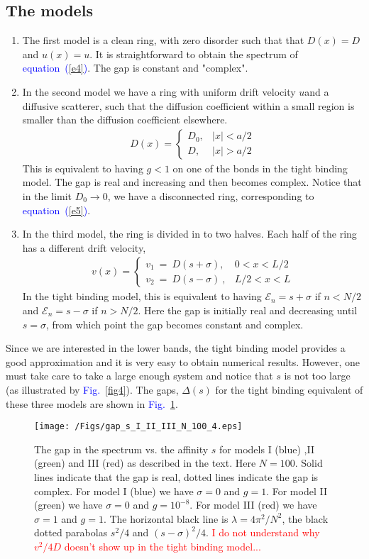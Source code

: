 \documentclass[aps,pre,floats,floatfix,fleqn,notitlepage]{revtex4-1}
\newcommand{\beq}{\begin{eqnarray}}
\newcommand{\eeq}{\end{eqnarray}}
\newcommand{\Eq}[1]{\textcolor{blue}{equation~(\ref{#1})}} %
\newcommand{\Fig}[1] {\textcolor{blue}{Fig.~\ref{#1}}} %
\newcommand{\rmrk}[1]{\textcolor{red}{#1}}
\begin{document}
\subsection{The models}
\begin{enumerate}
\item
The first model is a clean ring,  with zero disorder such that that  $D(x)=D$ and $u(x)=u$. 
It is straightforward to obtain the spectrum of \Eq{e4}.
%
The gap is constant and "complex". 
%
\item
In the second model we have a ring with uniform drift velocity $u$and a diffusive scatterer,
such that the diffusion coefficient within a small region is smaller than the diffusion coefficient elsewhere. 
%
\beq
D(x) = \left\{ \begin{array}{cc}
D_0, & |x|<a/2 \\
D, & |x|>a/2 
\end{array}
\right.
\eeq
%
This is equivalent to having $g<1$ on one of the bonds in the tight binding model.
The gap is real and increasing and then becomes complex. 
Notice that in the limit $D_0\to 0$, we have a disconnected ring, corresponding to \Eq{e5}.
%
\item
In the third model, the ring is divided in to two halves. Each half of the ring has a different drift velocity,
%
\beq
v(x) = \left\{ \begin{array}{cc}
v_1 \ =\  D(s+\sigma), & 0< x<L/2 \\
v_2 \ = \ D(s-\sigma)\ , & L/2<x<L
\end{array}
\right.
\eeq
%
In the tight binding model, this is equivalent to having $\mathcal{E}_n = s+\sigma$ if $n<N/2$ 
and $\mathcal{E}_n = s-\sigma$ if $n>N/2$. 
Here the gap is initially real and decreasing until $s=\sigma$, from which point the gap becomes constant and complex.
\end{enumerate}
%
Since we are interested in the lower bands, the tight binding model provides a good approximation 
and it is very easy to obtain numerical results.
However, one must take care to take a large enough system and notice that $s$ is not too large (as illustrated by \Fig{fig4}).
The gaps,  $\Delta(s)$ for the tight binding equivalent of these three models are shown in \Fig{fig12}.

\begin{figure}[h]
\texttt{[image: /Figs/gap\_s\_I\_II\_III\_N\_100\_4.eps]}
\caption{The gap in the spectrum vs. the affinity $s$ for models I (blue) ,II (green) and III (red) as described in the text. 
Here $N=100$. Solid lines indicate that the gap is real, dotted lines indicate the gap is complex. 
For model I (blue) we have $\sigma=0$ and $g=1$. For model II (green) we have $\sigma =0$ and $g=10^{-8}$. For model III (red) we have $\sigma = 1$ and $g=1$.
The horizontal black line is $\lambda=4\pi^2/N^2$, the black dotted parabolas  $s^2/4$ and $(s-\sigma)^2/4$.
\rmrk{I do not understand why $v^2/4D$ doesn't show up in the tight binding model...}
}
\label{fig12}
\end{figure}
\end{document}
